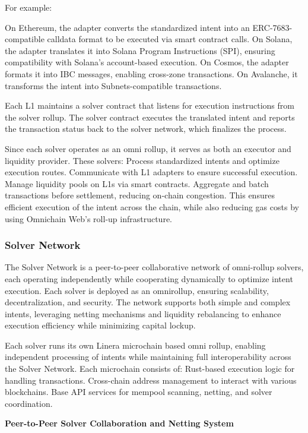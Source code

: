 For example:

    On Ethereum, the adapter converts the standardized intent into an ERC-7683-compatible calldata format to be executed via smart contract calls.
    On Solana, the adapter translates it into Solana Program Instructions (SPI), ensuring compatibility with Solana’s account-based execution.
    On Cosmos, the adapter formats it into IBC messages, enabling cross-zone transactions.
    On Avalanche, it transforms the intent into Subnets-compatible transactions.

Each L1 maintains a solver contract that listens for execution instructions from the solver rollup. The solver contract executes the translated intent and reports the transaction status back to the solver network, which finalizes the process.

Since each solver operates as an omni rollup, it serves as both an executor and liquidity provider. These solvers: Process standardized intents and optimize execution routes. Communicate with L1 adapters to ensure successful execution. Manage liquidity pools on L1s via smart contracts. Aggregate and batch transactions before settlement, reducing on-chain congestion.
This ensures efficient execution of the intent across the chain, while also reducing gas costs by using Omnichain Web’s roll-up infrastructure.

\subsubsection{Solver Network}
The Solver Network is a peer-to-peer collaborative network of omni-rollup solvers, each operating independently while cooperating dynamically to optimize intent execution. Each solver is deployed as an omnirollup, ensuring scalability, decentralization, and security. The network supports both simple and complex intents, leveraging netting mechanisms and liquidity rebalancing to enhance execution efficiency while minimizing capital lockup.

Each solver runs its own Linera microchain based omni rollup, enabling independent processing of intents while maintaining full interoperability across the Solver Network. Each microchain consists of: Rust-based execution logic for handling transactions. Cross-chain address management to interact with various blockchains. Base API services for mempool scanning, netting, and solver coordination.

\textbf{Peer-to-Peer Solver Collaboration and Netting System}

